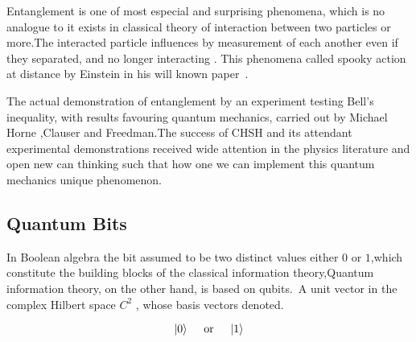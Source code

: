 
Entanglement is one of most especial and surprising phenomena, which is no analogue to it exists in classical theory of  interaction between two particles or more\citep{PhysRevLett.78.5022}.The interacted particle influences by measurement of each another even if they separated,  and no longer interacting . This phenomena  called spooky action at distance by Einstein in his will known paper~\cite{EPR}.


The actual demonstration of entanglement by an experiment testing Bell’s inequality, with results favouring quantum mechanics, carried out by Michael Horne ,Clauser and Freedman\citep{PhysRevLett.23.880}.The success of CHSH and its attendant experimental demonstrations received wide attention in the physics literature and open new can thinking such that how one we can implement this quantum mechanics unique phenomenon.
\subsection{Quantum Bits}

In Boolean algebra the bit assumed to be  two distinct values either $0 $ or $1$,which constitute the building blocks of the classical information theory,Quantum information theory, on the other hand, is based on qubits.\citep{nielsen2002quantum}~A unit vector in the  complex Hilbert space $C^2$ , whose basis vectors denoted.

\begin{equation}
\ket{0}~~~~\text{or}~~~~ \ket{1}
\end{equation}

